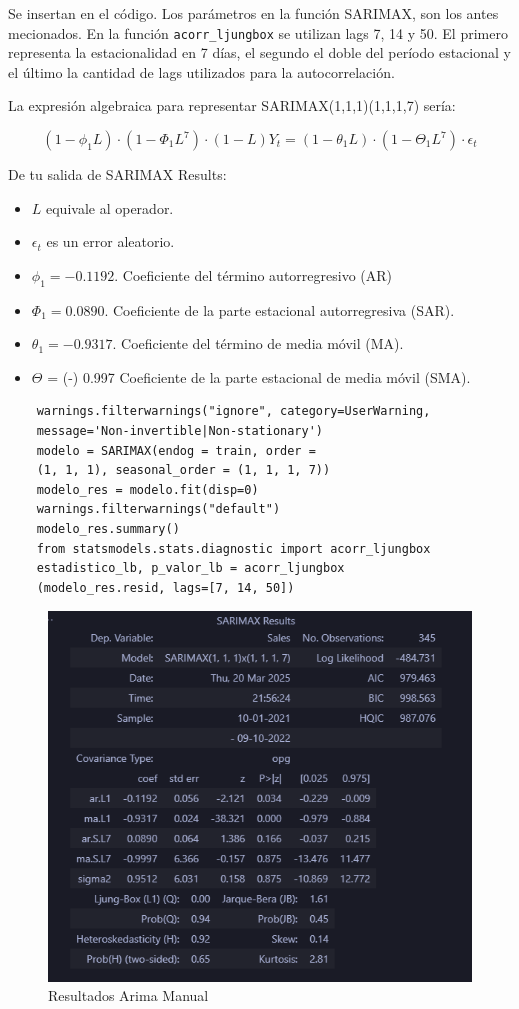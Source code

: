 Se insertan en el código. Los parámetros en la función SARIMAX, son los antes mecionados.  En la función \lstinline|acorr_ljungbox| se utilizan lags 7, 14 y 50. El primero representa la estacionalidad en 7 días, el segundo el doble del período estacional y el último la cantidad de lags utilizados para la autocorrelación.

La expresión algebraica para representar SARIMAX(1,1,1)(1,1,1,7) sería:

\begin{equation}[h]
	(1 - \phi_1L)\cdot(1 - \Phi_1L^7)\cdot(1 - L)Y_t = (1 - \theta_1L)\cdot(1 - \Theta_1L^7)\cdot \epsilon_t
\end{equation}

De tu salida de SARIMAX Results:
\begin{itemize}
	\item $L$ equivale al operador.
	\item $\epsilon_t$ es un error aleatorio.
	\item $\phi_1 = -0.1192$. Coeficiente del término autorregresivo (AR)
	\item $\Phi_1 = 0.0890$. Coeficiente de la parte estacional autorregresiva (SAR).
	\item $\theta_1 = -0.9317$. Coeficiente del término de media móvil (MA).
	\item $\Theta$ = (-) 0.997 Coeficiente de la parte estacional de media móvil (SMA).
\end{itemize}
	 
\begin{lstlisting}
	warnings.filterwarnings("ignore", category=UserWarning,
	message='Non-invertible|Non-stationary')
	modelo = SARIMAX(endog = train, order = 
	(1, 1, 1), seasonal_order = (1, 1, 1, 7))
	modelo_res = modelo.fit(disp=0)
	warnings.filterwarnings("default")
	modelo_res.summary()
	from statsmodels.stats.diagnostic import acorr_ljungbox
	estadistico_lb, p_valor_lb = acorr_ljungbox
	(modelo_res.resid, lags=[7, 14, 50])
\end{lstlisting}

\begin{figure}[!h]
	\centering
	\includegraphics[width=0.5\linewidth]{sarimax_resultados}
	\caption{Resultados Arima Manual}
	\label{fig:sarimaxresultados}
\end{figure}

